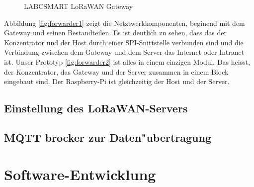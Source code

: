 \begin{figure}[h!]
	\centering
	\caption{LABCSMART LoRaWAN Gateway}
\end{figure}


Abbildung \ref{fig:forwarder1} zeigt die Netztwerkkomponenten, beginend mit dem Gateway und seinen Bestandteilen. Es ist deutlich zu sehen, dass das der Konzentrator und der Host durch einer SPI-Snittstelle verbunden sind und die Verbindung zwischen dem Gateway und dem Server das Internet oder Intranet ist. Unser Prototyp \ref{fig:forwarder2} ist alles in einem einzigen Modul. Das heisst, der Konzentrator, das Gateway und der Server zusammen in einem Block eingebaut sind. Der Raspberry-Pi ist gleichzeitig der Host und der Server. 


\section{Einstellung des LoRaWAN-Servers}\label{server}



\section{MQTT brocker zur Daten"ubertragung}


\chapter{Software-Entwicklung}\label{Soft-Ent}
